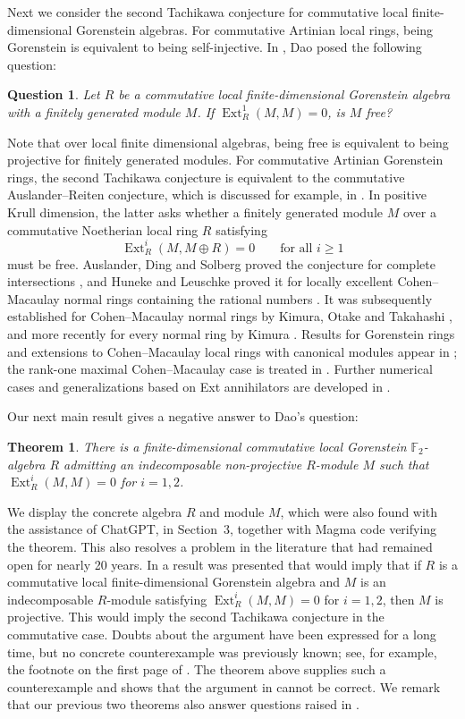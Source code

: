 \documentclass[a4paper]{amsart}
\newtheorem{theorem}{Theorem}[section]
\newtheorem*{question}{Question}
\theoremstyle{definition}
\theoremstyle{remark}
\numberwithin{equation}{section}
\newcommand{\Ext}{\operatorname{Ext}}
\begin{document}
Next we consider the second Tachikawa conjecture for commutative local finite-dimensional Gorenstein algebras. For commutative Artinian local rings, being Gorenstein is equivalent to being self-injective.
In \cite[Question 9.1.4]{D}, Dao posed the following question:
\begin{question}
Let $R$ be a commutative local finite-dimensional Gorenstein algebra with a finitely generated module $M$. If $\Ext_R^1(M,M)=0$, is $M$ free?
\end{question}
Note that over local finite dimensional algebras, being free is equivalent to being projective for finitely generated modules.
For commutative Artinian Gorenstein rings, the second Tachikawa conjecture is equivalent to the commutative Auslander--Reiten conjecture, which is discussed for example, in \cite{S}. In positive Krull dimension, the latter asks whether a finitely generated module $M$ over a commutative Noetherian local ring $R$ satisfying
\[
 \Ext_R^i(M,M\oplus R)=0\qquad\text{for all }i\geq1
\]
must be free. Auslander, Ding and Solberg proved the conjecture for complete intersections \cite{ADS}, and Huneke and Leuschke proved it for locally excellent Cohen--Macaulay normal rings containing the rational numbers \cite{HL}. It was subsequently established for Cohen--Macaulay normal rings by Kimura, Otake and Takahashi \cite{KOT}, and more recently for every normal ring by Kimura \cite{Ki}. Results for Gorenstein rings and extensions to Cohen--Macaulay local rings with canonical modules appear in \cite{Ar,OY,ACST}; the rank-one maximal Cohen--Macaulay case is treated in \cite{GT}. Further numerical cases and generalizations based on Ext annihilators are developed in \cite{LM,Es}.

Our next main result gives a negative answer to Dao's question:
\begin{theorem}
There is a finite-dimensional commutative local Gorenstein $\mathbb{F}_2$-algebra $R$ admitting an indecomposable non-projective $R$-module $M$ such that $\Ext_R^i(M,M)=0$ for $i=1,2$.
\end{theorem}
We display the concrete algebra $R$ and module $M$, which were also found with the assistance of ChatGPT, in Section~3, together with Magma code verifying the theorem.
This also resolves a problem in the literature that had remained open for nearly 20 years.
In \cite[Theorem~4.6]{LH} a result was presented that would imply that if $R$ is a commutative local finite-dimensional Gorenstein algebra and $M$ is an indecomposable $R$-module satisfying $\Ext_R^i(M,M)=0$ for $i=1,2$, then $M$ is projective. This would imply the second Tachikawa conjecture in the commutative case. Doubts about the argument have been expressed for a long time, but no concrete counterexample was previously known; see, for example, the footnote on the first page of \cite{S}. The theorem above supplies such a counterexample and shows that the argument in \cite[Theorem~4.6]{LH} cannot be correct.
We remark that our previous two theorems also answer questions raised in \cite[Questions 2.4 and 2.5]{MO}.
\end{document}
